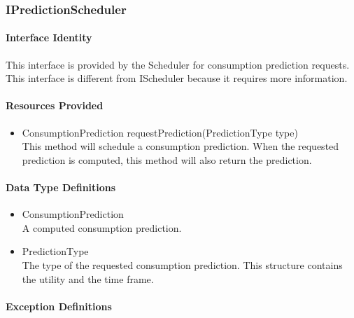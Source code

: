 \subsubsection{IPredictionScheduler}
\paragraph{Interface Identity}
This interface is provided by the Scheduler for consumption prediction
	requests. This interface is different from IScheduler because it
	requires more information.
\paragraph{Resources Provided}
\begin{itemize}
	\item{ConsumptionPrediction requestPrediction(PredictionType type)}\\
	This method will schedule a consumption prediction. When the requested prediction
		is computed, this method will also return the prediction.
\end{itemize}
\paragraph{Data Type Definitions}
\begin{itemize}
	\item ConsumptionPrediction\\
	A computed consumption prediction.
	\item PredictionType\\
	The type of the requested consumption prediction. This structure contains the utility
		and the time frame.
\end{itemize}
\paragraph{Exception Definitions}
